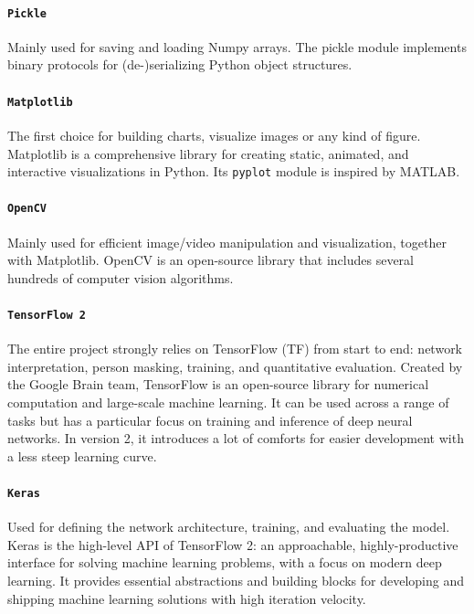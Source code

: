 \paragraph*{\texttt{Pickle}}
Mainly used for saving and loading Numpy arrays. The pickle module implements binary protocols for (de-)serializing Python object structures. 

\paragraph*{\texttt{Matplotlib}}
The first choice for building charts, visualize images or any kind of figure. Matplotlib is a comprehensive library for creating static, animated, and interactive visualizations in Python. Its \texttt{pyplot} module is inspired by MATLAB.

\paragraph*{\texttt{OpenCV}}
Mainly used for efficient image/video manipulation and visualization, together with Matplotlib. OpenCV is an open-source library that includes several hundreds of computer vision algorithms.

\paragraph*{\texttt{TensorFlow 2}}
The entire project strongly relies on TensorFlow \cite{tensorflow} (TF) from start to end: network interpretation, person masking, training, and quantitative evaluation. Created by the Google Brain team, TensorFlow is an open-source library for numerical computation and large-scale machine learning. It can be used across a range of tasks but has a particular focus on training and inference of deep neural networks. In version 2, it introduces a lot of comforts for easier development with a less steep learning curve.

\paragraph*{\texttt{Keras}}
Used for defining the network architecture, training, and evaluating the model. Keras  \cite{keras} is the high-level API of TensorFlow 2: an approachable, highly-productive interface for solving machine learning problems, with a focus on modern deep learning. It provides essential abstractions and building blocks for developing and shipping machine learning solutions with high iteration velocity.

